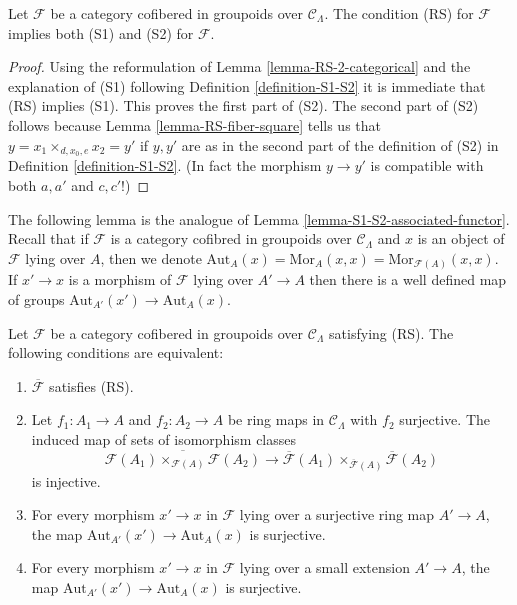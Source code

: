 \begin{lemma}
\label{lemma-RS-implies-S1-S2}
Let $\mathcal{F}$ be a category cofibered in groupoids over
$\mathcal{C}_\Lambda$. The condition (RS) for $\mathcal{F}$
implies both (S1) and (S2) for $\mathcal{F}$.
\end{lemma}

\begin{proof}
Using the reformulation of
Lemma \ref{lemma-RS-2-categorical}
and the explanation of (S1) following
Definition \ref{definition-S1-S2}
it is immediate that (RS) implies (S1).
This proves the first part of (S2). The second part of (S2)
follows because
Lemma \ref{lemma-RS-fiber-square}
tells us that $y = x_1 \times_{d, x_0, e} x_2 = y'$ if
$y, y'$ are as in the second part of the definition of (S2) in
Definition \ref{definition-S1-S2}. (In fact the morphism
$y \to y'$ is compatible with both $a, a'$ and $c, c'$!)
\end{proof}

\noindent
The following lemma is the analogue of
Lemma \ref{lemma-S1-S2-associated-functor}.
Recall that if $\mathcal{F}$ is a category cofibred in groupoids over
$\mathcal{C}_\Lambda$ and $x$ is an object of $\mathcal{F}$
lying over $A$, then we denote
$\text{Aut}_A(x) = \text{Mor}_A(x, x) = \text{Mor}_{\mathcal{F}(A)}(x, x)$.
If $x' \to x$ is a morphism of $\mathcal{F}$ lying over $A' \to A$
then there is a well defined map of groups
$\text{Aut}_{A'}(x') \to \text{Aut}_A(x)$.

\begin{lemma}
\label{lemma-RS-associated-functor}
Let $\mathcal{F}$ be a category cofibered in groupoids over
$\mathcal{C}_\Lambda$ satisfying (RS).
The following conditions are equivalent: 
\begin{enumerate}
\item $\overline{\mathcal{F}}$ satisfies (RS).
\item Let $f_1: A_1 \to A$ and $f_2: A_2 \to A$ be ring maps in 
$\mathcal{C}_\Lambda$ with $f_2$ surjective. The induced map
of sets of isomorphism classes
$$
\overline{\mathcal{F}(A_1) \times_{\mathcal{F}(A)} \mathcal{F}(A_2)}
\to \overline{\mathcal{F}}(A_1) \times_{\overline{\mathcal{F}}(A)} 
\overline{\mathcal{F}}(A_2)
$$
is injective.
\item For every morphism $x' \to x$ in $\mathcal{F}$ lying over a 
surjective ring map $A' \to A$, the map
$\text{Aut}_{A'}(x') \to \text{Aut}_A(x)$ is surjective.
\item For every morphism $x' \to x$ in $\mathcal{F}$ lying over a small 
extension $A' \to A$, the map
$\text{Aut}_{A'}(x') \to \text{Aut}_A(x)$ is surjective.
\end{enumerate}
\end{lemma}

